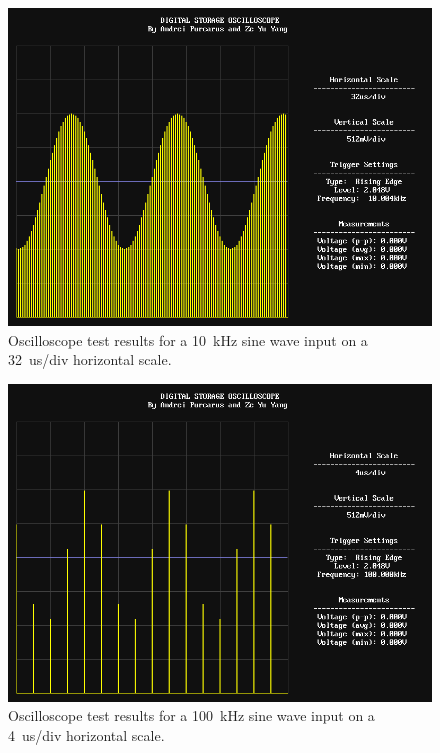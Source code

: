 \documentclass[journal]{IEEEtran}
\begin{document}
\begin{figure}[!htb]
  \centering
  \includegraphics[width=\columnwidth]{test-results/scope_demo_10kHz.png}
  \caption{Oscilloscope test results for a 10~kHz sine wave input on a 32~us/div horizontal scale.}
  \label{fig:scope_test_2}
\end{figure}

\begin{figure}[!htb]
  \centering
  \includegraphics[width=\columnwidth]{test-results/scope_demo_100kHz.png}
  \caption{Oscilloscope test results for a 100~kHz sine wave input on a 4~us/div horizontal scale.}
  \label{fig:scope_test_3}
\end{figure}
\end{document}
